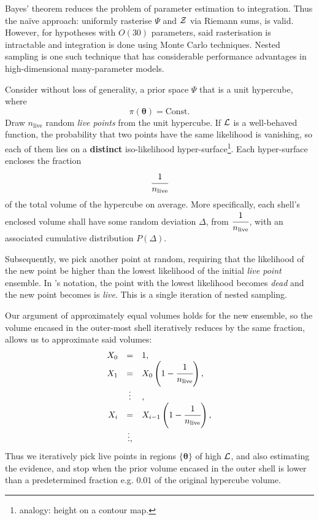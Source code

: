 \documentclass[usenatbib]{mnras}
\begin{document}
Bayes' theorem reduces the problem of parameter estimation to
integration. Thus the naïve approach: uniformly rasterise \(\Psi\) and
\({\cal Z}\) via Riemann sums, is valid. However, for hypotheses with
\(O(30)\) parameters, said rasterisation is intractable
\citep{Caflisch_1998} and integration is done using Monte Carlo
techniques. Nested sampling is one such technique that has
considerable performance advantages in high-dimensional many-parameter
models.

Consider without loss of generality, a prior space \(\Psi\) that is a
unit hypercube, where \[\pi(\bm{\theta}) = \text{Const.}\] Draw
\(n_\text{live}\) random \emph{live points} from the unit
hypercube. If \({\cal L}\) is a well-behaved function, the probability
that two points have the same likelihood is vanishing, so each of them
lies on a \textbf{distinct} iso-likelihood
hyper-surface\footnote{analogy: height on a contour map. }. Each
hyper-surface encloses the fraction
\begin{equation}
\cfrac{1}{n_\text{live}}
\end{equation}
of the total volume of the hypercube on average. More specifically,
each shell's enclosed volume shall have some random deviation \(\Delta\), from
\(\cfrac{1}{n_\text{live}}\), with an associated cumulative
distribution \(P(\Delta)\).

Subsequently, we pick another point at random, requiring that the
likelihood of the new point be higher than the lowest likelihood of
the initial \emph{live point} ensemble. In \citeauthor{Skilling2006}'s
notation, the point with the lowest likelihood becomes \emph{dead} and
the new point becomes is \emph{live}. This is a single iteration of
nested sampling.

Our argument of approximately equal volumes holds for the new
ensemble, so the volume encased in the outer-most shell iteratively
reduces by the same fraction, allows us to approximate said volumes:
\begin{equation}\label{eq:recurrence-relation}
  \begin{array}{rcl}
  X_{0} &=  &1, \\
  X_{1} &= &X_{0} \left(1- \cfrac{1}{n_\text{live}}\right),\\
  & \vdots &, \\
  X_{i} &= &X_{i-1}\left(1- \cfrac{1}{n_\text{live}}\right),\\
  & \vdots, &
\end{array}
\end{equation}
Thus we iteratively pick live points in regions $\{\bm{\theta}\}$ of
high \({\cal L}\), and also estimating the evidence, and stop when the
prior volume encased in the outer shell is lower than a predetermined
fraction e.g. \(0.01\) of the original hypercube volume.
\end{document}
